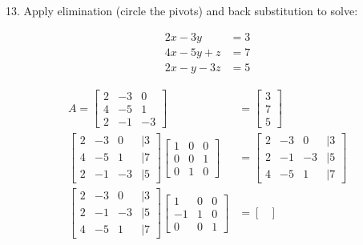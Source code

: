 \documentclass[paper=a4, fontsize=10pt]{scrartcl} %
\begin{document}
\subsection*{}
\setcounter{equation}{0}

13. Apply elimination (circle the pivots) and back substitution to solve:

	\begin{align*}
		2x - 3y &= 3 \\
		4x - 5y + z &= 7 \\
		2x - y - 3z &= 5
	\end{align*}

	\begin{align*}
		A =
		\begin{bmatrix}
			2 & -3 & 0 \\
			4 & -5 & 1 \\
			2 & -1 & -3
		\end{bmatrix}
		&=
		\begin{bmatrix}
			3 \\ 7 \\ 5
		\end{bmatrix}
		\\
		\begin{bmatrix}
			2 & -3 & 0 &| 3\\
			4 & -5 & 1 &| 7\\
			2 & -1 & -3 &| 5
		\end{bmatrix}
		\begin{bmatrix}
			1 & 0 & 0 \\
			0 & 0 & 1 \\
			0 & 1 & 0
		\end{bmatrix}
		&=
		\begin{bmatrix}
			2 & -3 & 0 &| 3 \\
			2 & -1 & -3 &| 5 \\
			4 & -5 & 1 &| 7
		\end{bmatrix}
		\\
		\begin{bmatrix}
			2 & -3 & 0 &| 3 \\
			2 & -1 & -3 &| 5 \\
			4 & -5 & 1 &| 7
		\end{bmatrix}
		\begin{bmatrix}
			1 & 0 & 0 \\
			-1 & 1 & 0 \\
			0 & 0 & 1
		\end{bmatrix}
		&=
		\begin{bmatrix}

\end{bmatrix}
\end{align*}
\end{document}

